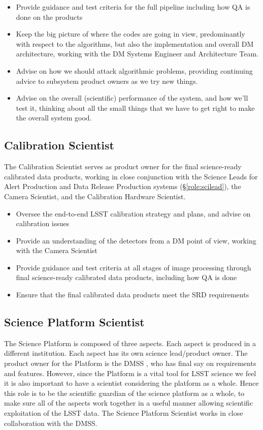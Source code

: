 \begin{itemize}

\item Provide guidance and test criteria for the full pipeline including how QA is done on the products
\item Keep the big picture of where the codes are going in view, predominantly with respect to the algorithms, but also the implementation and overall DM architecture, working with the DM Systems Engineer and Architecture Team. 
\item Advise on how we should attack algorithmic problems, providing continuing advice to subsystem product owners as we try new things.
\item Advise on the overall (scientific) performance of the system, and how we'll test it, thinking about all the small things that we have to get right to make the overall system good.

\end{itemize}

\subsection{Calibration Scientist \label{role:calsci}}

The Calibration Scientist serves as product owner for the final science-ready calibrated data products, working in close conjunction with the Science Leads for Alert Production and Data Release Production systems (\S\ref{role:scilead}), the Camera Scientist, and the Calibration Hardware Scientist.

\begin{itemize}
\item Oversee the end-to-end LSST calibration strategy and plans, and advise on calibration issues
\item Provide an understanding of the detectors from a DM point of view, working with the Camera Scientist
\item Provide guidance and test criteria at all stages of image processing through final science-ready calibrated data products, including how QA is done
\item Ensure that the final calibrated data products meet the SRD requirements 
\end{itemize}

\subsection{Science Platform Scientist \label{role:scip}}
The Science Platform is composed of three aspects. Each aspect is produced in a different institution.
Each aspect has its own science lead/product owner.
The product owner for the Platform is the DMSS , who has final say on requirements and features.
However, since the Platform is a vital tool for LSST science we feel it is also important to have a scientist considering the platform as a whole.
Hence this role is to be the scientific guardian of the science platform as a whole, to make sure all of the aspects work together in a useful manner allowing scientific exploitation of the LSST data. The Science Platform Scientist works in close collaboration with the \gls{DMSS}.

